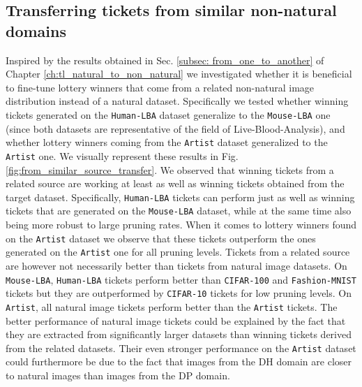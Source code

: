 

\subsection{Transferring tickets from similar non-natural domains}
Inspired by the results obtained in Sec. \ref{subsec: from_one_to_another} of Chapter \ref{ch:tl_natural_to_non_natural} we investigated whether it is beneficial to fine-tune lottery winners that come from a related non-natural image distribution instead of a natural dataset. Specifically we tested whether winning tickets generated on the \texttt{Human-LBA} dataset generalize to the \texttt{Mouse-LBA} one (since both datasets are representative of the field of Live-Blood-Analysis), and whether lottery winners coming from the \texttt{Artist}  dataset generalized to the \texttt{Artist}  one. We visually represent these results in Fig. \ref{fig:from_similar_source_transfer}. We observed that winning tickets from a related source are working at least as well as winning tickets obtained from the target dataset. Specifically, \texttt{Human-LBA} tickets can perform just as well as winning tickets that are generated on the \texttt{Mouse-LBA} dataset, while at the same time also being more robust to large pruning rates. When it comes to lottery winners found on the \texttt{Artist}  dataset we observe that these tickets outperform the ones generated on the \texttt{Artist}  one for all pruning levels. Tickets from a related source are however not necessarily better than tickets from natural image datasets. On \texttt{Mouse-LBA}, \texttt{Human-LBA} tickets perform better than \texttt{CIFAR-100} and \texttt{Fashion-MNIST} tickets but they are outperformed by \texttt{CIFAR-10} tickets for low pruning levels. On \texttt{Artist}, all natural image tickets perform better than the \texttt{Artist} tickets. The better performance of natural image tickets could be explained by the fact that they are extracted from significantly larger datasets than winning tickets derived from the related datasets. Their even stronger performance on the \texttt{Artist} dataset could furthermore be due to the fact that images from the DH domain are closer to natural images than images from the DP domain.


